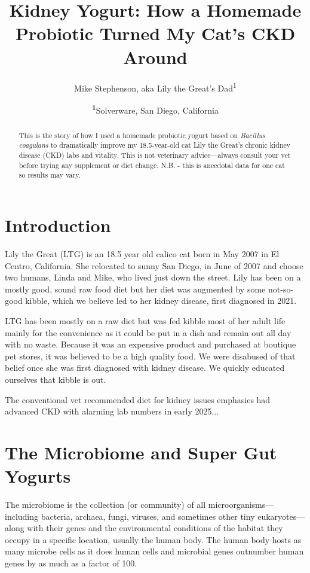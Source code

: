 \documentclass[twocolumn]{NobArticle}
\title{Kidney Yogurt: How a Homemade Probiotic Turned My Cat's CKD Around}
\author{Mike Stephenson, aka Lily the Great's Dad\textsuperscript{1}}
\date{\textsuperscript{\textbf{1}}Solverware, San Diego, California}
\begin{document}
	
	\maketitle
	
	\begin{abstract}
		This is the story of how I used a homemade probiotic yogurt based on \textit{Bacillus coagulans} to dramatically improve my 18.5-year-old cat Lily the Great's chronic kidney disease (CKD) labs and vitality. This is not veterinary advice—always consult your vet before trying any supplement or diet change. N.B. - this is anecdotal data for one cat so results may vary.
	\end{abstract}
	
	\section{Introduction}
	Lily the Great (LTG) is an 18.5 year old calico cat born in May 2007 in El Centro, California. She relocated to sunny San Diego, in June of 2007 and choose two humans, Linda and Mike, who lived just down the street. Lily has been on a mostly good, sound raw food diet but her diet was augmented by some not-so-good kibble, which we believe led to her kidney disease, first diagnosed in 2021.
	
	LTG has been mostly on a raw diet but was fed kibble most of her adult life mainly for the convenience as it could be put in a dish and remain out all day with no waste. Because it was an expensive product and purchased at boutique pet stores, it was believed to be a high quality food. We were disabused of that belief once she was first diagnosed with kidney disease. We quickly educated ourselves that kibble is out.
	
	The conventional vet recommended diet for kidney issues emphasies
	had advanced CKD with alarming lab numbers in early 2025...
	
		
	
	\section{The Microbiome and Super Gut Yogurts}
	The microbiome is the collection (or community) of all microorganisms—including bacteria, archaea, fungi, viruses, and sometimes other tiny eukaryotes—along with their genes and the environmental conditions of the habitat they occupy in a specific location, usually the human body. The human body hosts as many microbe cells as it does human cells and microbial genes outnumber human genes by as much as a factor of 100. 
	
\end{document}
